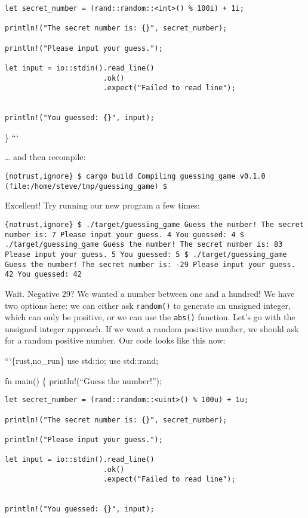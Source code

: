 \documentclass[]{article}
\begin{document}
\begin{verbatim}
let secret_number = (rand::random::<int>() % 100i) + 1i;

println!("The secret number is: {}", secret_number);

println!("Please input your guess.");

let input = io::stdin().read_line()
                       .ok()
                       .expect("Failed to read line");


println!("You guessed: {}", input);
\end{verbatim}

\} ```

\ldots{} and then recompile:

\texttt{\{notrust,ignore\} \$ cargo build   Compiling guessing\_game v0.1.0 (file:/home/steve/tmp/guessing\_game) \$}

Excellent! Try running our new program a few times:

\texttt{\{notrust,ignore\} \$ ./target/guessing\_game  Guess the number! The secret number is: 7 Please input your guess. 4 You guessed: 4 \$ ./target/guessing\_game  Guess the number! The secret number is: 83 Please input your guess. 5 You guessed: 5 \$ ./target/guessing\_game  Guess the number! The secret number is: -29 Please input your guess. 42 You guessed: 42}

Wait. Negative 29? We wanted a number between one and a hundred! We have
two options here: we can either ask \texttt{random()} to generate an
unsigned integer, which can only be positive, or we can use the
\texttt{abs()} function. Let's go with the unsigned integer approach. If
we want a random positive number, we should ask for a random positive
number. Our code looks like this now:

```\{rust,no\_run\} use std::io; use std::rand;

fn main() \{ println!(``Guess the number!'');

\begin{verbatim}
let secret_number = (rand::random::<uint>() % 100u) + 1u;

println!("The secret number is: {}", secret_number);

println!("Please input your guess.");

let input = io::stdin().read_line()
                       .ok()
                       .expect("Failed to read line");


println!("You guessed: {}", input);
\end{verbatim}
\end{document}
